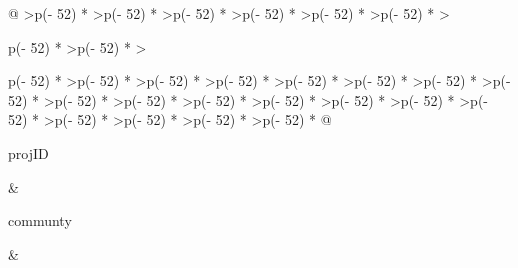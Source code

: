 \documentclass[
]{article}
\begin{document}
\begin{longtable}[]{@{}
  >{\raggedleft\arraybackslash}p{(\columnwidth - 52\tabcolsep) * }
  >{\raggedleft\arraybackslash}p{(\columnwidth - 52\tabcolsep) * }
  >{\raggedleft\arraybackslash}p{(\columnwidth - 52\tabcolsep) * }
  >{\raggedleft\arraybackslash}p{(\columnwidth - 52\tabcolsep) * }
  >{\raggedleft\arraybackslash}p{(\columnwidth - 52\tabcolsep) * }
  >{\raggedleft\arraybackslash}p{(\columnwidth - 52\tabcolsep) * }
  >{\raggedright\arraybackslash}p{(\columnwidth - 52\tabcolsep) * }
  >{\raggedleft\arraybackslash}p{(\columnwidth - 52\tabcolsep) * }
  >{\raggedright\arraybackslash}p{(\columnwidth - 52\tabcolsep) * }
  >{\raggedleft\arraybackslash}p{(\columnwidth - 52\tabcolsep) * }
  >{\raggedleft\arraybackslash}p{(\columnwidth - 52\tabcolsep) * }
  >{\raggedleft\arraybackslash}p{(\columnwidth - 52\tabcolsep) * }
  >{\raggedleft\arraybackslash}p{(\columnwidth - 52\tabcolsep) * }
  >{\raggedleft\arraybackslash}p{(\columnwidth - 52\tabcolsep) * }
  >{\raggedleft\arraybackslash}p{(\columnwidth - 52\tabcolsep) * }
  >{\raggedleft\arraybackslash}p{(\columnwidth - 52\tabcolsep) * }
  >{\raggedleft\arraybackslash}p{(\columnwidth - 52\tabcolsep) * }
  >{\raggedleft\arraybackslash}p{(\columnwidth - 52\tabcolsep) * }
  >{\raggedleft\arraybackslash}p{(\columnwidth - 52\tabcolsep) * }
  >{\raggedleft\arraybackslash}p{(\columnwidth - 52\tabcolsep) * }
  >{\raggedleft\arraybackslash}p{(\columnwidth - 52\tabcolsep) * }
  >{\raggedleft\arraybackslash}p{(\columnwidth - 52\tabcolsep) * }
  >{\raggedleft\arraybackslash}p{(\columnwidth - 52\tabcolsep) * }
  >{\raggedleft\arraybackslash}p{(\columnwidth - 52\tabcolsep) * }
  >{\raggedleft\arraybackslash}p{(\columnwidth - 52\tabcolsep) * }
  >{\raggedleft\arraybackslash}p{(\columnwidth - 52\tabcolsep) * }
  >{\raggedleft\arraybackslash}p{(\columnwidth - 52\tabcolsep) * }@{}}
\toprule\noalign{}
\begin{minipage}[b]{\linewidth}\raggedleft
projID
\end{minipage} & \begin{minipage}[b]{\linewidth}\raggedleft
communty
\end{minipage} & \begin{minipage}[b]{\linewidth}\raggedleft

\end{minipage}
\end{longtable}
\end{document}
